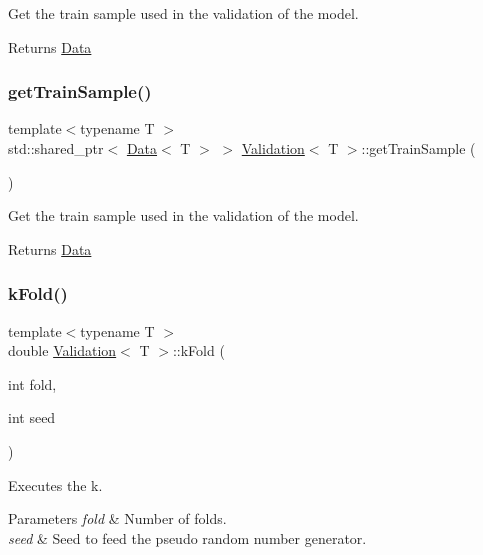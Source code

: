 Get the train sample used in the validation of the model. 

\begin{DoxyReturn}{Returns}
\hyperlink{class_data}{Data} 
\end{DoxyReturn}
\mbox{\label{class_validation_a11cf518681b25799f231ce973ad45095}} 
\subsubsection{\texorpdfstring{get\+Train\+Sample()}{getTrainSample()}}
{\footnotesize\ttfamily template$<$typename T $>$ \\
std\+::shared\+\_\+ptr$<$ \hyperlink{class_data}{Data}$<$ T $>$ $>$ \hyperlink{class_validation}{Validation}$<$ T $>$\+::get\+Train\+Sample (\begin{DoxyParamCaption}{ }\end{DoxyParamCaption})}



Get the train sample used in the validation of the model. 

\begin{DoxyReturn}{Returns}
\hyperlink{class_data}{Data} 
\end{DoxyReturn}
\mbox{\label{class_validation_a1a5825e2dd051a72aaffd423a0df55f1}} 
\subsubsection{\texorpdfstring{k\+Fold()}{kFold()}}
{\footnotesize\ttfamily template$<$typename T $>$ \\
double \hyperlink{class_validation}{Validation}$<$ T $>$\+::k\+Fold (\begin{DoxyParamCaption}\item[{int}]{fold,  }\item[{int}]{seed }\end{DoxyParamCaption})}



Executes the k. 


\begin{DoxyParams}{Parameters}
{\em fold} & Number of folds. \\
\hline
{\em seed} & Seed to feed the pseudo random number generator. \\
\hline
\end{DoxyParams}
\mbox{\label{class_validation_a1e9580697a164d4bfbe721f2f1589c57}} 
